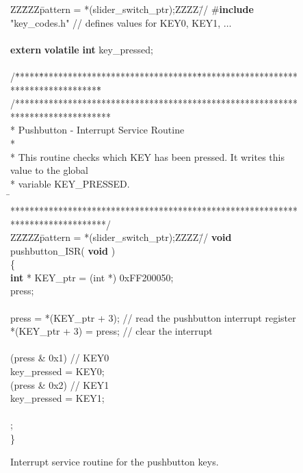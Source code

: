 \begin{figure}[h!]
\begin{center}
\begin{minipage}[t]{12.5 cm}
\begin{tabbing}
ZZ\=ZZZ\=pattern = *(slider\_switch\_ptr);ZZZZ\=//\kill
\#{\bf include} "key\_codes.h" \>\>\>// defines values for KEY0, KEY1, $\ldots$\\
\\
{\bf extern} {\bf volatile} {\bf int} key\_pressed;\\
\\
/\=*****\=*********************************\=****************************************\=\kill
/********************************************************************************\\
\>* Pushbutton - Interrupt Service Routine                                \\
\>*                                                                          \\
\>* This routine checks which KEY has been pressed. It writes this value to the global \\
\>* variable KEY\_PRESSED.\\
\=\kill
\>********************************************************************************/\\
ZZ\=ZZZ\=pattern = *(slider\_switch\_ptr);ZZZZ\=//\kill
{\bf void} pushbutton\_ISR( {\bf void} )\\
\{\\
 {\bf int} * KEY\_ptr = (int *) 0xFF200050;\\
 press;\\
\\
\>press = *(KEY\_ptr + 3); \>\>// read the pushbutton interrupt register\\
\>*(KEY\_ptr + 3) = press; \>\>// clear the interrupt\\
\\
 (press \& 0x1) \>\>// KEY0\\
\>\>key\_pressed = KEY0;\\
 (press \& 0x2) \>\>// KEY1\\
\>\>key\_pressed = KEY1;\\
\\
;\\
\}\\
\end{tabbing}
\end{minipage}
\end{center}
	\caption{Interrupt service routine for the pushbutton keys.}
   \label{fig:pushbutton_isr_C}
\end{figure}
